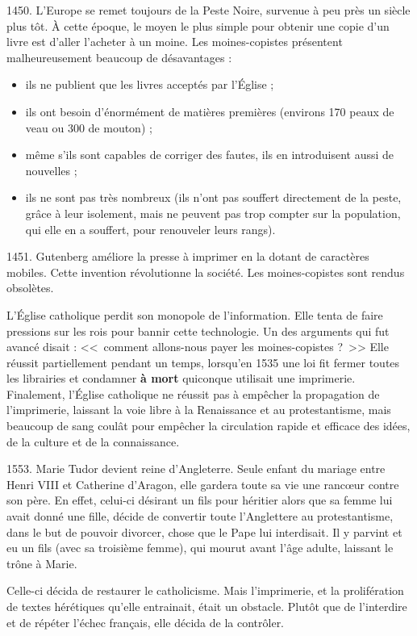 1450.
L'Europe se remet toujours de la Peste Noire, survenue à peu près un siècle plus tôt.
À cette époque, le moyen le plus simple pour obtenir une copie d'un livre est d'aller l'acheter à un moine.
Les moines-copistes présentent malheureusement beaucoup de désavantages :

\begin{itemize}
\item ils ne publient que les livres acceptés par l'Église ;
\item ils ont besoin d'énormément de matières premières (environs 170 peaux de veau ou 300 de mouton) ;
\item même s'ils sont capables de corriger des fautes, ils en introduisent aussi de nouvelles ;
\item ils ne sont pas très nombreux (ils n'ont pas souffert directement de la peste, grâce à leur isolement, mais ne peuvent pas trop compter sur la population, qui elle en a souffert, pour renouveler leurs rangs).
\end{itemize}

1451.
Gutenberg améliore la presse à imprimer en la dotant de caractères mobiles.
Cette invention révolutionne la société.
Les moines-copistes sont rendus obsolètes.

L'Église catholique perdit son monopole de l'information.
Elle tenta de faire pressions sur les rois pour bannir cette technologie.
Un des arguments qui fut avancé disait : <<~comment allons-nous payer les moines-copistes ?~>>
Elle réussit partiellement pendant un temps, lorsqu'en 1535 une loi fit fermer toutes les librairies et condamner \textbf{à mort} quiconque utilisait une imprimerie.
Finalement, l'Église catholique ne réussit pas à empêcher la propagation de l'imprimerie, laissant la voie libre à la Renaissance et au protestantisme, mais beaucoup de sang coulât pour empêcher la circulation rapide et efficace des idées, de la culture et de la connaissance.

1553.
Marie Tudor devient reine d'Angleterre.
Seule enfant du mariage entre Henri VIII et Catherine d'Aragon, elle gardera toute sa vie une rancœur contre son père.
En effet, celui-ci désirant un fils pour héritier alors que sa femme lui avait donné une fille, décide de convertir toute l'Anglettere au protestantisme, dans le but de pouvoir divorcer, chose que le Pape lui interdisait.
Il y parvint et eu un fils (avec sa troisième femme), qui mourut avant l'âge adulte, laissant le trône à Marie.

Celle-ci décida de restaurer le catholicisme.
Mais l'imprimerie, et la prolifération de textes hérétiques qu'elle entrainait, était un obstacle.
Plutôt que de l'interdire et de répéter l'échec français, elle décida de la contrôler.

